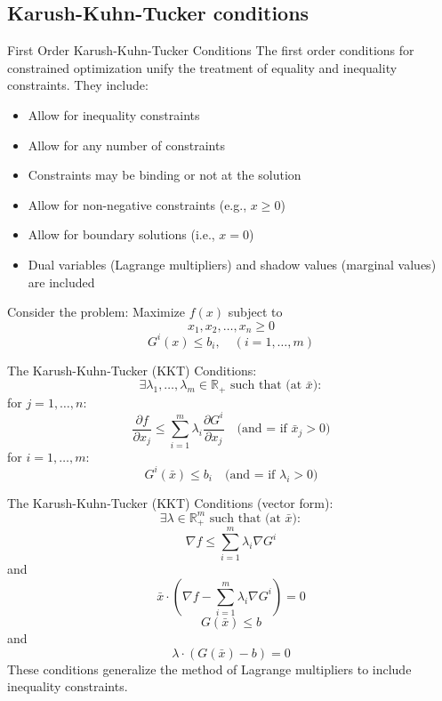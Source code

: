 \documentclass[c]{beamer}
\begin{document}
\subsection{Karush-Kuhn-Tucker conditions}

\begin{frame}[allowframebreaks]{First Order Karush-Kuhn-Tucker Conditions}
The first order conditions for constrained optimization unify the treatment of equality and inequality constraints. They include:
\begin{itemize}
  \item Allow for inequality constraints
  \item Allow for any number of constraints
  \item Constraints may be binding or not at the solution
  \item Allow for non-negative constraints (e.g., $x\geq 0$)
  \item Allow for boundary solutions (i.e., $x=0$)
  \item Dual variables (Lagrange multipliers) and shadow values (marginal values) are included
\end{itemize}

Consider the problem:
Maximize \( f(x) \) subject to
\[
x_1, x_2, \ldots, x_n \ge 0
\]
\[
G^i(x) \le b_i, \quad (i = 1, \ldots, m)
\]
\framebreak

The Karush-Kuhn-Tucker (KKT) Conditions:
\[
\exists \lambda_1, \ldots, \lambda_m \in \mathbb{R}_+ \text{ such that (at } \bar{x}):
\]
for \( j = 1, \ldots, n \):
\[
\frac{\partial f}{\partial x_j} \le \sum_{i=1}^m \lambda_i \frac{\partial G^i}{\partial x_j}
\quad \text{(and = if } \bar{x}_j > 0)
\]
for \( i = 1, \ldots, m \):
\[
G^i(\bar{x}) \le b_i
\quad \text{(and = if } \lambda_i > 0)
\]
\framebreak

The Karush-Kuhn-Tucker (KKT) Conditions (vector form):
\[
\exists \lambda \in \mathbb{R}_+^m \text{ such that (at } \bar{x}):
\]
\[
\nabla f \le \sum_{i=1}^m \lambda_i \nabla G^i
\]
and
\[
\bar{x} \cdot \left( \nabla f - \sum_{i=1}^m \lambda_i \nabla G^i \right) = 0
\]
\[
G(\bar{x}) \le b
\]
and
\[
\lambda \cdot (G(\bar{x}) - b) = 0
\]
These conditions generalize the method of Lagrange multipliers to include inequality constraints.
\end{frame}

\end{document}
